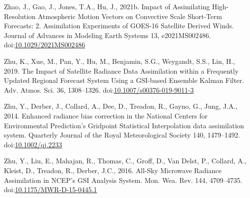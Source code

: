\documentclass[authoryear,preprint,review,12pt]{elsarticle} %
\begin{document}
\leavevmode\hypertarget{ref-zhao2021a}{}%
Zhao, J., Gao, J., Jones, T.A., Hu, J., 2021b. Impact of Assimilating High-Resolution Atmospheric Motion Vectors on Convective Scale Short-Term Forecasts: 2. Assimilation Experiments of GOES-16 Satellite Derived Winds. Journal of Advances in Modeling Earth Systems 13, e2021MS002486. doi:\href{https://doi.org/10.1029/2021MS002486}{10.1029/2021MS002486}

\leavevmode\hypertarget{ref-zhu2019}{}%
Zhu, K., Xue, M., Pan, Y., Hu, M., Benjamin, S.G., Weygandt, S.S., Lin, H., 2019. The Impact of Satellite Radiance Data Assimilation within a Frequently Updated Regional Forecast System Using a GSI-based Ensemble Kalman Filter. Adv. Atmos. Sci. 36, 1308--1326. doi:\href{https://doi.org/10.1007/s00376-019-9011-3}{10.1007/s00376-019-9011-3}

\leavevmode\hypertarget{ref-zhu2014}{}%
Zhu, Y., Derber, J., Collard, A., Dee, D., Treadon, R., Gayno, G., Jung, J.A., 2014. Enhanced radiance bias correction in the National Centers for Environmental Prediction's Gridpoint Statistical Interpolation data assimilation system. Quarterly Journal of the Royal Meteorological Society 140, 1479--1492. doi:\href{https://doi.org/10.1002/qj.2233}{10.1002/qj.2233}

\leavevmode\hypertarget{ref-zhu2016}{}%
Zhu, Y., Liu, E., Mahajan, R., Thomas, C., Groff, D., Van Delst, P., Collard, A., Kleist, D., Treadon, R., Derber, J.C., 2016. All-Sky Microwave Radiance Assimilation in NCEP's GSI Analysis System. Mon. Wea. Rev. 144, 4709--4735. doi:\href{https://doi.org/10.1175/MWR-D-15-0445.1}{10.1175/MWR-D-15-0445.1}
\end{document}
